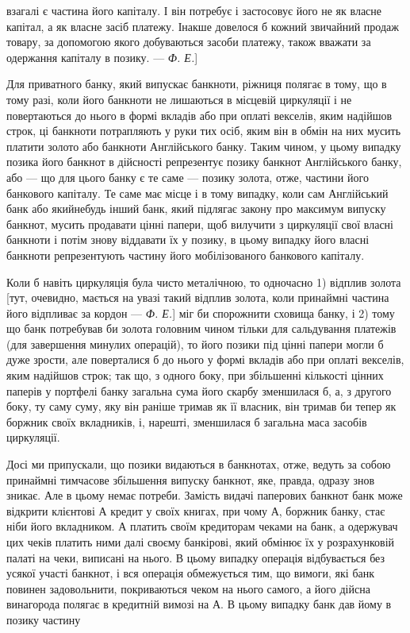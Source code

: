 \parcont{}  %
взагалі є частина його капіталу. І він потребує і застосовує його
не як власне капітал, а як власне засіб платежу. Інакше довелося
б кожний звичайний продаж товару, за допомогою якого
добуваються засоби платежу, також вважати за одержання капіталу
в позику. — \emph{Ф. Е.}]

Для приватного банку, який випускає банкноти, ріжниця полягає
в тому, що в тому разі, коли його банкноти не лишаються
в місцевій циркуляції і не повертаються до нього в формі
вкладів або при оплаті векселів, яким надійшов строк, ці банкноти
потрапляють у руки тих осіб, яким він в обмін на них
мусить платити золото або банкноти Англійського банку.
Таким чином, у цьому випадку позика його банкнот в дійсності
репрезентує позику банкнот Англійського банку, або — що для
цього банку є те саме — позику золота, отже, частини його
банкового капіталу. Те саме має місце і в тому випадку, коли
сам Англійський банк або якийнебудь інший банк, який підлягає
закону про максимум випуску банкнот, мусить продавати
цінні папери, щоб вилучити з циркуляції свої власні банкноти
і потім знову віддавати їх у позику, в цьому випадку
його власні банкноти репрезентують частину його мобілізованого
банкового капіталу.

Коли б навіть циркуляція була чисто металічною, то одночасно
1) відплив золота [тут, очевидно, мається на увазі такий
відплив золота, коли принаймні частина його відпливає за кордон
— \emph{Ф. Е.}] міг би спорожнити сховища банку, і 2) тому що
банк потребував би золота головним чином тільки для сальдування
платежів (для завершення минулих операцій), то його позики
під цінні папери могли б дуже зрости, але поверталися б до
нього у формі вкладів або при оплаті векселів, яким надійшов
строк; так що, з одного боку, при збільшенні кількості цінних
паперів у портфелі банку загальна сума його скарбу зменшилася
б, а, з другого боку, ту саму суму, яку він раніше тримав
як її власник, він тримав би тепер як боржник своїх вкладників,
і, нарешті, зменшилася б загальна маса засобів циркуляції.

Досі ми припускали, що позики видаються в банкнотах,
отже, ведуть за собою принаймні тимчасове збільшення випуску
банкнот, яке, правда, одразу знов зникає. Але в цьому
немає потреби. Замість видачі паперових банкнот банк може
відкрити клієнтові $А$ кредит у своїх книгах, при чому $А$, боржник
банку, стає ніби його вкладником. $А$ платить своїм кредиторам
чеками на банк, а одержувач цих чеків платить ними
далі своєму банкірові, який обмінює їх у розрахунковій палаті на
чеки, виписані на нього. В цьому випадку операція відбувається
без усякої участі банкнот, і вся операція обмежується тим, що
вимоги, які банк повинен задовольнити, покриваються чеком на
нього самого, а його дійсна винагорода полягає в кредитній вимозі
на $А$. В цьому випадку банк дав йому в позику частину
\parbreak{}  %
